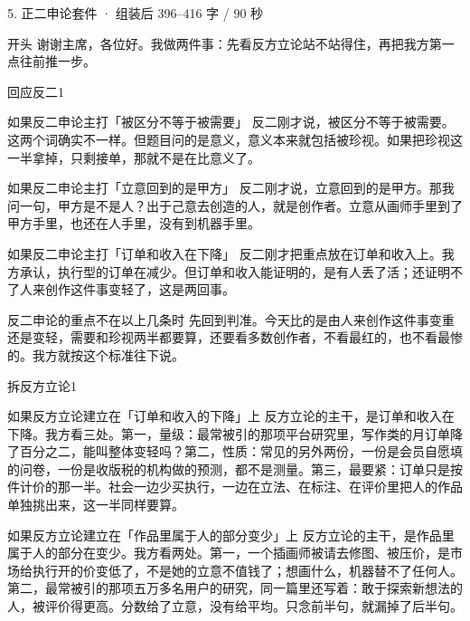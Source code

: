 \documentclass[script,pro]{debate}
\begin{document}
\begin{kit}{5. 正二申论}{套件 · 组装后 396–416 字 / 90 秒}
\begin{fixed}{开头}
谢谢主席，各位好。我做两件事：先看反方立论站不站得住，再把我方第一点往前推一步。
\end{fixed}
\begin{pick}{回应反二}{1}
\begin{module}{如果反二申论主打「被区分不等于被需要」}
反二刚才说，被区分不等于被需要。这两个词确实不一样。但题目问的是意义，意义本来就包括被珍视。如果把珍视这一半拿掉，只剩接单，那就不是在比意义了。
\end{module}
\begin{module}{如果反二申论主打「立意回到的是甲方」}
反二刚才说，立意回到的是甲方。那我问一句，甲方是不是人？出于己意去创造的人，就是创作者。立意从画师手里到了甲方手里，也还在人手里，没有到机器手里。
\end{module}
\begin{module}{如果反二申论主打「订单和收入在下降」}
反二刚才把重点放在订单和收入上。我方承认，执行型的订单在减少。但订单和收入能证明的，是有人丢了活；还证明不了人来创作这件事变轻了，这是两回事。
\end{module}
\begin{fallback}{反二申论的重点不在以上几条时}
先回到判准。今天比的是由人来创作这件事变重还是变轻，需要和珍视两半都要算，还要看多数创作者，不看最红的，也不看最惨的。我方就按这个标准往下说。
\end{fallback}
\end{pick}
\begin{pick}{拆反方立论}{1}
\begin{module}{如果反方立论建立在「订单和收入的下降」上}
反方立论的主干，是订单和收入在下降。我方看三处。第一，量级：最常被引的那项平台研究里，写作类的月订单降了百分之二，能叫整体变轻吗？第二，性质：常见的另外两份，一份是会员自愿填的问卷，一份是收版税的机构做的预测，都不是测量。第三，最要紧：订单只是按件计价的那一半。社会一边少买执行，一边在立法、在标注、在评价里把人的作品单独挑出来，这一半同样要算。
\end{module}
\begin{module}{如果反方立论建立在「作品里属于人的部分变少」上}
反方立论的主干，是作品里属于人的部分在变少。我方看两处。第一，一个插画师被请去修图、被压价，是市场给执行开的价变低了，不是她的立意不值钱了；想画什么，机器替不了任何人。第二，最常被引的那项五万多名用户的研究，同一篇里还写着：敢于探索新想法的人，被评价得更高。分数给了立意，没有给平均。只念前半句，就漏掉了后半句。

\end{module}
\end{pick}
\end{kit}
\end{document}
